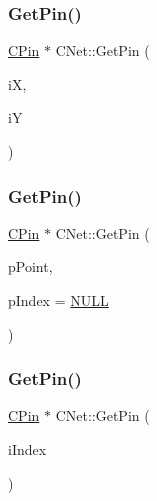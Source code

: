 \mbox{\label{classCNet_ad0f4f9b80de19edb6731cda71fd450a7}} 
\subsubsection{\texorpdfstring{GetPin()}{GetPin()}\hspace{0.1cm}{\footnotesize\ttfamily [1/3]}}
{\footnotesize\ttfamily \mbox{\hyperlink{classCPin}{C\+Pin}} $\ast$ C\+Net\+::\+Get\+Pin (\begin{DoxyParamCaption}\item[{int}]{iX,  }\item[{int}]{iY }\end{DoxyParamCaption})}

\mbox{\label{classCNet_a3af1e1df7ab2044f1ad50bc460e84f9c}} 
\subsubsection{\texorpdfstring{GetPin()}{GetPin()}\hspace{0.1cm}{\footnotesize\ttfamily [2/3]}}
{\footnotesize\ttfamily \mbox{\hyperlink{classCPin}{C\+Pin}} $\ast$ C\+Net\+::\+Get\+Pin (\begin{DoxyParamCaption}\item[{\mbox{\hyperlink{classCPoint}{C\+Point}} $\ast$}]{p\+Point,  }\item[{int $\ast$}]{p\+Index = {\ttfamily \mbox{\hyperlink{BoxRouter_8h_a070d2ce7b6bb7e5c05602aa8c308d0c4}{N\+U\+LL}}} }\end{DoxyParamCaption})}

\mbox{\label{classCNet_afa01af65ac2f23050bab801b844034ce}} 
\subsubsection{\texorpdfstring{GetPin()}{GetPin()}\hspace{0.1cm}{\footnotesize\ttfamily [3/3]}}
{\footnotesize\ttfamily \mbox{\hyperlink{classCPin}{C\+Pin}} $\ast$ C\+Net\+::\+Get\+Pin (\begin{DoxyParamCaption}\item[{int}]{i\+Index }\end{DoxyParamCaption})}


